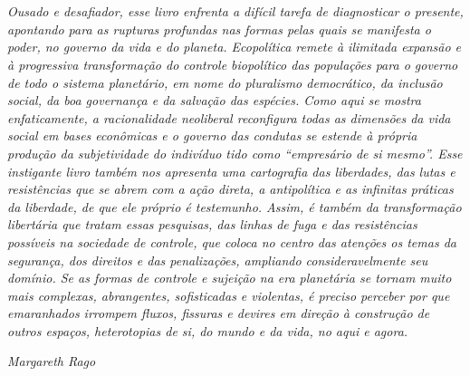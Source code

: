 \chapter*{}

\vspace*{\fill}

\begin{flushright}
\begin{adjustwidth}{2.0cm}{}
\raggedleft\small\emph{Ousado e desafiador, esse livro enfrenta a difícil tarefa de
diagnosticar o presente, apontando para as rupturas profundas nas formas
pelas quais se manifesta o poder, no governo da vida e do planeta.
\emph{Ecopolítica} remete à ilimitada expansão e à progressiva
transformação do controle biopolítico das populações para o governo de
todo o sistema planetário, em nome do pluralismo democrático, da
inclusão social, da boa governança e da salvação das espécies. Como aqui
se mostra enfaticamente, a racionalidade neoliberal reconfigura todas as
dimensões da vida social em bases econômicas e o governo das condutas se
estende à própria produção da subjetividade do indivíduo tido como
``empresário de si mesmo''. Esse instigante livro também nos apresenta
uma cartografia das liberdades, das lutas e resistências que se abrem
com a ação direta, a antipolítica e as infinitas práticas da liberdade,
de que ele próprio é testemunho. Assim, é também da transformação
libertária que tratam essas pesquisas, das linhas de fuga e das
resistências possíveis na sociedade de controle, que coloca no centro
das atenções os temas da segurança, dos direitos e das penalizações,
ampliando consideravelmente seu domínio. Se as formas de controle e
sujeição na era planetária se tornam muito mais complexas, abrangentes,
sofisticadas e violentas, é preciso perceber por que emaranhados
irrompem fluxos, fissuras e devires em direção à construção de outros
espaços, heterotopias de si, do mundo e da vida, no aqui e agora.}

\medskip

\emph{Margareth Rago}
\end{adjustwidth}
\end{flushright}
\thispagestyle{empty}




